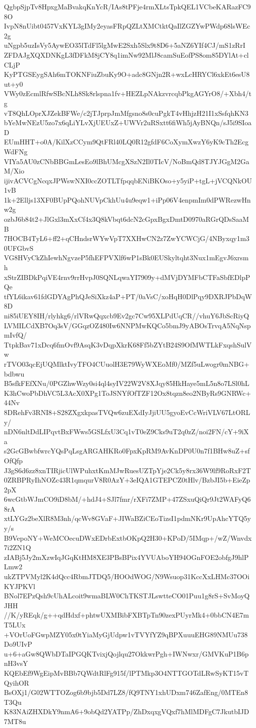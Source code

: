 QgbpSjpTv8HpxgMaBvakqKnYcR/IAs8tPFje4rmXLtsTpkQEL1VCbeKARazFC98O
IvpN8nUibt0457VxKYL3gIMy2eyasFRpQZLtXMCtktQaIlZGZYwPWdp68lsWEc2g
uNgpb5uzIsVy5AywEO35lTdFl5lgMwE2Sxh5Slx9t8D6+5aNZ6YIf4CJ/mS1zRrI
ZFDAJgXQXDNKgL3fDFkM8jCY8q1imNw92MlJ8camSuEofPS8om85DYlAt+clCLjP
KyPTGSEygSAh6mTOKNFiuZbuKy9O+adc8GNjn2R+wxLcHRYCl6xkEt6esU8ut+y0
VWy0zEcmlRfwSBcNLh8Sk8rlspna1fv+HEZLpNAkzvrcqbPkgAGYrO8/+Xbh4/tg
vT8QhLOprXJZekBFWe/c2jTJprpJmMfgsno8s0cuPgkT4vHhjzH21I1xSsfqhKN3
bYeMwNEzU5zo7x6qLiYLvXjUEUxZ+UWVr2uRSxtt6fiWh5jAyBNQn/sJ5i9SIoaD
EUmHHT+o0A/KilXzCCym9QtFRl40LQ0R12gfdF6CoXymXwzY6yK9cTh2EcgWdFNg
VIYa5AU0zCNbBBGmLesEo9lBhUMcgXSzN2Il0TIcV/NoBmQd8TJYJGgM2GaM/Xio
ijivACVCgNcqxJPWswNXI0ccZOTLTfpqqbENiBKOso+y5yiP+tgL+jVCQNkOU1vB
1k+2Elljs13XF0BUpPQohNUVpCkhUu4u9eqw1+iPp06V4enpmIm0dPWRezwHnw2g
ozbJ6b84t2+JlGxl3mXxCf4x3Q8kVbqt6dcN2cGpxBgxDmtD0970aRGrQDsSaaMB
7HOCB4TyL6+ff2+qCHndsrWYwVpT7XXHwCN2z7ZwYCWCjG/4NByxqy1m30UFGbvS
VG8HVyCkZhIewhNgvzeP5fhEFPVXlf6wP1sBk0EUSkyltqht3Nux1mEgvJ6xrsmh
xStrZIBDkPqiVE4rnv9rrHvpJ0SQNLqwaYI7909y+dMVjDYMFbCTFaSbfEDlpPQe
tfYL6ikav61fdGDYAgPhQJeSiXkz4aP+PT/0aVsC/xoHqH0DlPqy9DXRJPbDqW8D
ni85iUEY8IH/rlyhkg6/rlVRwQqxcb9Ev2gc7Cw95XLPdUqCR//vhuY6JbScRiyQ
LVMILCdXB7Oq3sV/GGqzOZ480Iw6NNPMwKQCo5bmJ9yABOsTrvqA5NqNspmIvfQ/
TtpkBav71xDcq6fmOvf9AsqK3vDqpXkrK68Ff5bZYtB24S9OfMWTLkFxqshSulVw
rTVO03qcEjUQMlktIvyTFO4CUuolH3E79WyWXEoMf0/MZf5uLwogr0mNBG+bdbwu
B5sfkFEfXNu/0PGZhwWzy0si4ql4syIV22W2V8XJqy85HkHaye5mL5n8o7LSl0hL
K3hCwoPbDhVC5L3AcX0XPg1ToJSNYfOfTZF12Ox8tqzn8eo2NByRs9GNRWc+44Nv
8DRehFv3RNI8+S28ZXgxkpasTVQw6zuEXdIyJjiUU5gyoEvCcWriVLV67LtORLy/
nDN6nltDdLIPqvtBxFWws5GSLfxU3Cq1vT0eZ9Cks9uT2q0zZ/noi2FN/cY+9iXa
s2GcGBwbfwrcYQsPqLsgARGAHKRo0FpxKpRM9AvKnDP0U0n7f1BHw8uZ+sfOfQfp
J3gS6d6zz8xnTIRjicUlWPuhxtKmMJwRuesUZTpYje2Ck5y8rx36W9lf9RoRxF2T
0ZRBPRyIhNOZc43R1qmqurV8R0AzY+3eIQA1GTEPCZ0tHlv/BzbJI5b+EieZp2pX
6wcGtbWJmCO9iD8bM/+hdJ4+SJl7fmr/rXFi7ZMP+47ZSxuQiQr9Jt2WAFyQ68rA
xtLYGz2beXlR8M3nh/qcWv8GVaF+JIWaBZiCEoTizsI1pdmNKr9UpAhcYTQ5yy/s
B9VepoNY+WeMCOecuDWxEDrbExtbOKpQ2H30+KPoD/5IMqp+/wZ/Wnvdx7i2ZN1Q
zIABj5Jy2mXzwIqJGqKtHM8XE3PBsBPix4YVUAboYH94OGnFOE2obfgJ9hlPLmw2
ukZTPVMyl2K4dQcc4RbmJTDQ5/HOOdWOG/N9Wsuop31KccXxLHMc37OOiKYJPKVl
BNol7EPzQsh9cUhALcoit9wmaBLW0ChTKSTJLswtteCO01Puu1g8rS+SvMoyQJHH
//K/yREqk/g++qdHdxf+phtwUXMBibFXBTpTn90zexPUyrMk4+0bbCN4E7mT5LUx
+VOrUoFGwpMZY05x0tYiaMyGjUdpw1vTVYfYZ9qBPXuuuEHG89NMUu738Do9UIvP
u+6+aGw8QWbDTaIPGQKTvixjQojlqu27OkkwrPgh+IWNwxr/GMVKuP1B6pnH3vsY
KQEbEf9WgEipMvBBb7QWdtRlFg915f/lPTMkp3O4NTTGOTdLRwSyKT15vTQyihOR
BsOXj1/G02WTTOZog6b9bjb5Dd7LZ8/fQ9TNY1xhUDxm746ZafEng/0MTEn8T3Qu
K83NAiZHXDkY9nmA6+9obQd2YATPp/ZhDxqxgVQxf7hMlMDFgC7JkutbIJD7MT8u
